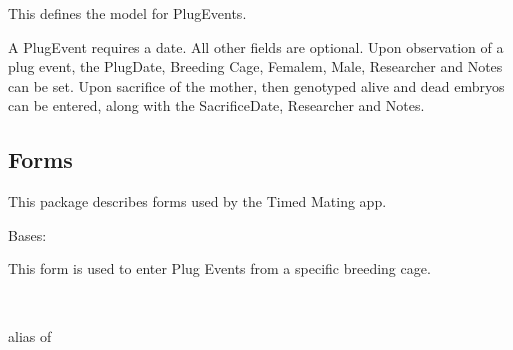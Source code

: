\documentclass[letterpaper,10pt,english]{sphinxmanual}
\begin{document}
\begin{fulllineitems}
\begin{fulllineitems}
This defines the model for PlugEvents.

A PlugEvent requires a date.  All other fields are optional.
Upon observation of a plug event, the PlugDate, Breeding Cage, Femalem, Male, Researcher and Notes can be set.
Upon sacrifice of the mother, then genotyped alive and dead embryos can be entered, along with the SacrificeDate, Researcher and Notes.

\end{fulllineitems}



\subsection{Forms}
\label{api:id7}\label{api:module-timed_mating.forms}
This package describes forms used by the Timed Mating app.

\begin{fulllineitems}
\label{api:timed_mating.forms.BreedingPlugForm}
Bases: 

This form is used to enter Plug Events from a specific breeding cage.

\begin{fulllineitems}
\label{api:timed_mating.forms.BreedingPlugForm.Meta}~

\begin{fulllineitems}
\label{api:timed_mating.forms.BreedingPlugForm.Meta.model}
alias of 

\end{fulllineitems}


\end{fulllineitems}


\begin{fulllineitems}
\label{api:timed_mating.forms.BreedingPlugForm.media}
\end{fulllineitems}



\end{fulllineitems}
\end{fulllineitems}
\end{document}
